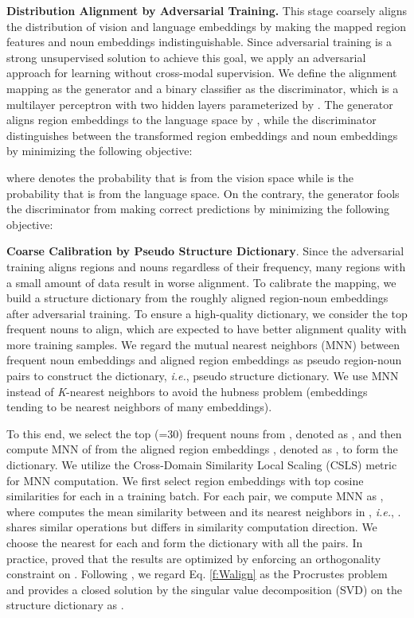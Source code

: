 \documentclass[letterpaper]{article} \usepackage{aaai24}  \usepackage{times}  \usepackage{helvet}  \usepackage{courier}  \usepackage[hyphens]{url}  \usepackage{graphicx} \urlstyle{rm} \def\UrlFont{\rm}  \usepackage{natbib}  \usepackage{caption} \frenchspacing  \setlength{\pdfpagewidth}{8.5in}  \setlength{\pdfpageheight}{11in}
\begin{document}
\noindent\textbf{Distribution Alignment by Adversarial Training.} 
This stage coarsely aligns the distribution of vision and language embeddings by making the mapped region features  and noun embeddings  indistinguishable. Since adversarial training is a strong unsupervised solution to achieve this goal, we apply an adversarial approach for learning  without cross-modal supervision. 
We define the alignment mapping  as the generator and a binary classifier as the discriminator, which is a multilayer perceptron with two hidden layers parameterized by . The generator aligns region embeddings to the language space by  , while the discriminator distinguishes between the transformed region embeddings and noun embeddings  by minimizing the following objective:

where  denotes the probability that  is from the vision space while  is the probability that  is from the language space. On the contrary, the generator fools the discriminator from making correct predictions by minimizing the following objective:


\noindent\textbf{Coarse Calibration by Pseudo Structure Dictionary}. Since the adversarial training aligns regions and nouns regardless of their frequency, many regions with a small amount of data result in worse alignment. To calibrate the mapping, we build a structure dictionary from the roughly aligned region-noun embeddings after adversarial training. To ensure a high-quality dictionary, we consider the top frequent nouns to align, which are expected to have better alignment quality with more training samples. We regard the mutual nearest neighbors (MNN) \cite{lample2018word} between frequent noun embeddings and aligned region embeddings as pseudo region-noun pairs to construct the dictionary, \textit{i.e.}, pseudo structure dictionary. We use MNN instead of \textit{K}-nearest neighbors to avoid the hubness problem \cite{2014arXiv1412.6568D} (embeddings tending to be nearest neighbors of many embeddings).

To this end, we select the top  (=30) frequent nouns from , denoted as , and then compute MNN of  from the aligned region embeddings , denoted as , to form the dictionary.  We utilize the Cross-Domain Similarity Local Scaling (CSLS) metric \cite{lample2018word} for MNN computation. We first select  region embeddings  with top  cosine similarities for each  in a training batch. For each  pair, we compute MNN as , where  computes the mean similarity between  and its  nearest neighbors in , \textit{i.e.},  .  shares similar operations but differs in similarity computation direction. We choose the nearest  for each  and form the dictionary with all the  pairs. In practice, \cite{xing2015normalized} proved that the results are optimized by enforcing an orthogonality constraint on . Following \cite{xing2015normalized}, we regard Eq. \ref{f:Walign} as the Procrustes problem and provides a closed solution by the singular value decomposition (SVD) on the structure dictionary as .
\end{document}

